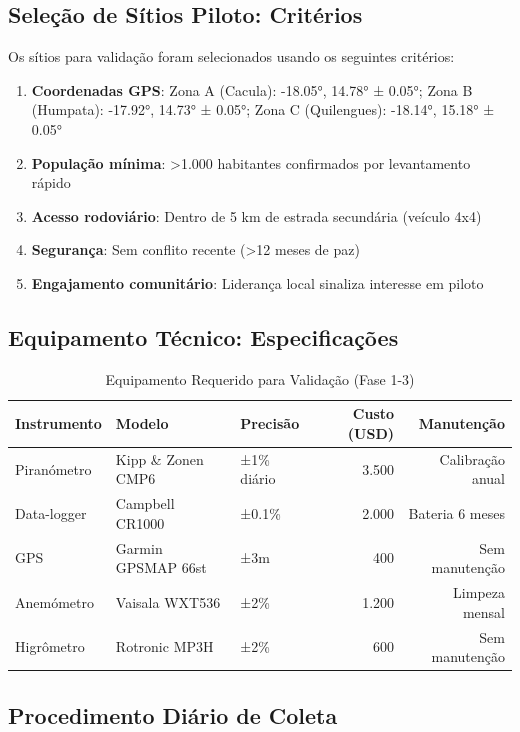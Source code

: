 \documentclass[12pt, a4paper]{article}
\begin{document}
\subsection{Seleção de Sítios Piloto: Critérios}

Os sítios para validação foram selecionados usando os seguintes critérios:

\begin{enumerate}
\item \textbf{Coordenadas GPS}: Zona A (Cacula): -18.05°, 14.78° ± 0.05°; Zona B (Humpata): -17.92°, 14.73° ± 0.05°; Zona C (Quilengues): -18.14°, 15.18° ± 0.05°
\item \textbf{População mínima}: >1.000 habitantes confirmados por levantamento rápido
\item \textbf{Acesso rodoviário}: Dentro de 5 km de estrada secundária (veículo 4x4)
\item \textbf{Segurança}: Sem conflito recente (>12 meses de paz)
\item \textbf{Engajamento comunitário}: Liderança local sinaliza interesse em piloto
\end{enumerate}

\subsection{Equipamento Técnico: Especificações}

\begin{table}[H]
\centering
\caption{Equipamento Requerido para Validação (Fase 1-3)}
\label{tab:equipment_specs}
\small
\begin{tabular}{|l|l|l|r|r|}
\hline
\textbf{Instrumento} & \textbf{Modelo} & \textbf{Precisão} & \textbf{Custo (USD)} & \textbf{Manutenção} \\
\hline
Piranómetro & Kipp \& Zonen CMP6 & ±1\% diário & 3.500 & Calibração anual \\
Data-logger & Campbell CR1000 & ±0.1\% & 2.000 & Bateria 6 meses \\
GPS & Garmin GPSMAP 66st & ±3m & 400 & Sem manutenção \\
Anemómetro & Vaisala WXT536 & ±2\% & 1.200 & Limpeza mensal \\
Higrômetro & Rotronic MP3H & ±2\% & 600 & Sem manutenção \\
\hline
\end{tabular}
\end{table}

\subsection{Procedimento Diário de Coleta}
\end{document}
